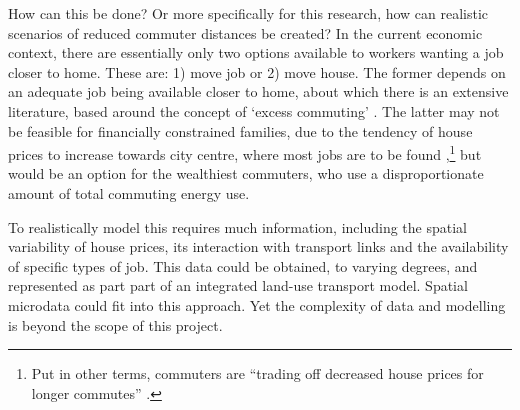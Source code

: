 How can this be done? Or more specifically for this research,
how can realistic scenarios of
reduced commuter distances be created? In the current economic context,
there are essentially only two options available to workers wanting a job
closer to home. These are: 1) move job or 2) move house. The former depends on
an adequate job being available closer to home, about which there is
an extensive literature, based around the concept of `excess commuting'
\citep{Buliung2002}.
The latter may not be feasible for financially constrained families,
due to the tendency of house prices to increase towards city centre, where
most jobs are to be found
\citep{Li2012},\footnote{Put in other terms,
commuters are ``trading off decreased house prices for longer commutes''
\citep[p.~312]{Li2012}.
}
but would be an option for the wealthiest commuters, who use a disproportionate
amount of total commuting energy use.

To realistically model this requires much information, including
the spatial variability
of house prices, its interaction with transport links and the availability
of specific types of job. This data could be obtained, to varying degrees,
and represented as part part of an integrated land-use transport model.
Spatial microdata could fit into this approach.
Yet the complexity of data and modelling is beyond the scope of this project.

